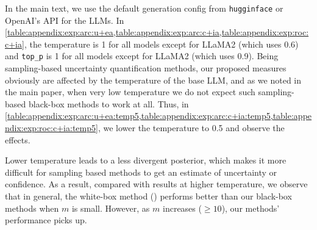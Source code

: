 In the main text, we use the default generation config from \texttt{hugginface} or OpenAI's API for the LLMs.
In \cref{table:appendix:exp:arc:u+ea,table:appendix:exp:arc:c+ia,table:appendix:exp:roc:c+ia}, the temperature is 1 for all models except for LLaMA2 (which uses 0.6) and \texttt{top\_p} is 1 for all models except for LLaMA2 (which uses 0.9).
Being sampling-based uncertainty quantification methods, our proposed measures obviously are affected by the temperature of the base LLM, and as we noted in the main paper, when very low temperature we do not expect such sampling-based black-box methods to work at all. 
Thus, in \cref{table:appendix:exp:arc:u+ea:temp5,table:appendix:exp:arc:c+ia:temp5,table:appendix:exp:roc:c+ia:temp5}, we lower the temperature to 0.5 and observe the effects. 

Lower temperature leads to a less divergent posterior, which makes it more difficult for sampling based methods to get an estimate of uncertainty or confidence.
As a result, compared with results at higher temperature, we observe that in general, the white-box method (\baselineGal) performs better than our black-box methods when $m$ is small.
However, as $m$ increases ($\geq 10$), our methods' performance picks up.



